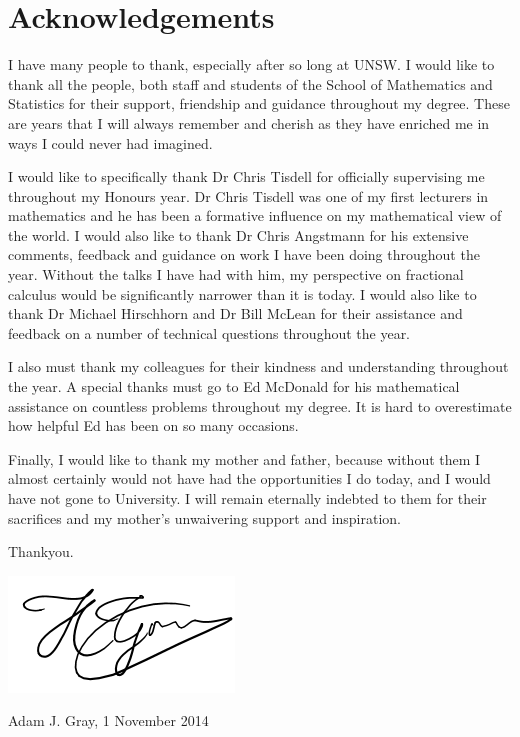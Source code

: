 \section*{Acknowledgements}

I have many people to thank, especially after so long at UNSW. I would like to thank all the people, both staff and students of the School of Mathematics and Statistics for their support, friendship and guidance throughout my degree. These are years that I will always remember and cherish as they have enriched me in ways I could never had imagined. 

I would like to specifically thank Dr Chris Tisdell for officially supervising me throughout my Honours year. Dr Chris Tisdell was one of my first lecturers in mathematics and he has been a formative influence on my mathematical view of the world. I would also like to thank Dr Chris Angstmann for his extensive comments, feedback and guidance on work I have been doing throughout the year. Without the talks I have had with him, my perspective on fractional calculus would be significantly narrower than it is today. I would also like to thank Dr Michael Hirschhorn and Dr Bill McLean for their assistance and feedback on a number of technical questions throughout the year.

I also must thank my colleagues for their kindness and understanding throughout the year. A special thanks must go to Ed McDonald for his mathematical assistance on countless problems throughout my degree. It is hard to overestimate how helpful Ed has been on so many occasions. 

Finally, I would like to thank my mother and father, because without them I almost certainly would not have had the opportunities I do today, and I would have not gone to University. I will remain eternally indebted to them for their sacrifices and my mother's unwaivering support and inspiration.

\vspace{2cm}
\begin{center}
Thankyou.
\end{center}
\vspace{2cm}

\includegraphics[scale=1.3]{images/signature}



Adam J. Gray, 1 November 2014
\clearpage
